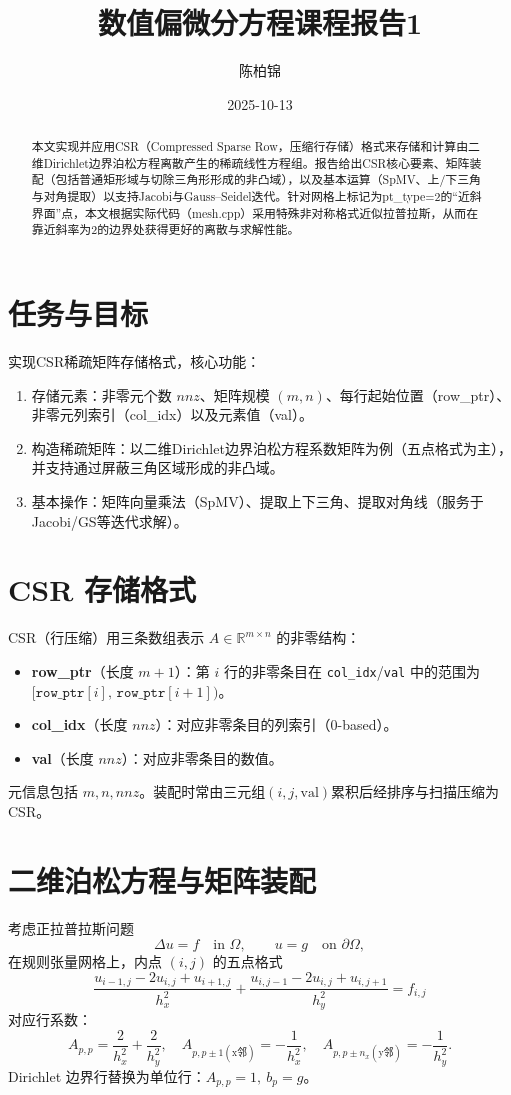 \documentclass[11pt,a4paper]{article}
\title{数值偏微分方程课程报告1}
\author{陈柏锦}
\date{2025-10-13}
\begin{document}
\maketitle

\begin{abstract}
本文实现并应用CSR（Compressed Sparse Row，压缩行存储）格式来存储和计算由二维Dirichlet边界泊松方程离散产生的稀疏线性方程组。报告给出CSR核心要素、矩阵装配（包括普通矩形域与切除三角形形成的非凸域），以及基本运算（SpMV、上/下三角与对角提取）以支持Jacobi与Gauss--Seidel迭代。针对网格上标记为pt\_type=2的“近斜界面”点，本文根据实际代码（mesh.cpp）采用特殊非对称格式近似拉普拉斯，从而在靠近斜率为2的边界处获得更好的离散与求解性能。
\end{abstract}

\section{任务与目标}
实现CSR稀疏矩阵存储格式，核心功能：
\begin{enumerate}
  \item 存储元素：非零元个数 $nnz$、矩阵规模 $(m,n)$、每行起始位置（row\_ptr）、非零元列索引（col\_idx）以及元素值（val）。
  \item 构造稀疏矩阵：以二维Dirichlet边界泊松方程系数矩阵为例（五点格式为主），并支持通过屏蔽三角区域形成的非凸域。
  \item 基本操作：矩阵向量乘法（SpMV）、提取上下三角、提取对角线（服务于Jacobi/GS等迭代求解）。
\end{enumerate}

\section{CSR 存储格式}
CSR（行压缩）用三条数组表示 $A\in\mathbb{R}^{m\times n}$ 的非零结构：
\begin{itemize}
  \item \textbf{row\_ptr}（长度 $m+1$）：第 $i$ 行的非零条目在 \texttt{col\_idx}/\texttt{val} 中的范围为 $[\texttt{row\_ptr}[i],\,\texttt{row\_ptr}[i{+}1])$。
  \item \textbf{col\_idx}（长度 $nnz$）：对应非零条目的列索引（0-based）。
  \item \textbf{val}（长度 $nnz$）：对应非零条目的数值。
\end{itemize}
元信息包括 $m,n,nnz$。装配时常由三元组$(i,j,\text{val})$累积后经排序与扫描压缩为CSR。

\section{二维泊松方程与矩阵装配}
考虑正拉普拉斯问题
\[
  \Delta u = f \quad \text{in } \Omega,\qquad
  u = g \quad \text{on } \partial\Omega,
\]
在规则张量网格上，内点 $(i,j)$ 的五点格式
\[
  \frac{u_{i-1,j}-2u_{i,j}+u_{i+1,j}}{h_x^2}
+ \frac{u_{i,j-1}-2u_{i,j}+u_{i,j+1}}{h_y^2} = f_{i,j}
\]
对应行系数：
\[
A_{p,p}=\frac{2}{h_x^2}+\frac{2}{h_y^2},\quad
A_{p,p\pm 1(\text{x邻})}=-\frac{1}{h_x^2},\quad
A_{p,p\pm n_x(\text{y邻})}=-\frac{1}{h_y^2}.
\]
Dirichlet 边界行替换为单位行：$A_{p,p}=1,\ b_p=g$。
\end{document}
